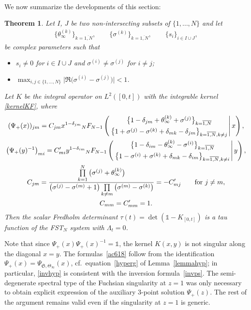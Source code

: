\documentclass[pdftex]{sigma}
\numberwithin{equation}{section}
\newtheorem{Theorem}{Theorem}[section]
\begin{document}
We now summarize the developments of this section:
\begin{Theorem}\label{theorem2F1} Let $I$, $J$ be two non-intersecting subsets of $\{1,\ldots,N\}$ and let
\begin{gather*}
\bigl\{\theta_{\infty}^{(k)}\bigr\}_{k=\overline{1,N}},\qquad \bigl\{\sigma^{(k)}\bigr\}_{k=\overline{1,N}},\qquad \{s_i \}_{i\in I\cup J},
\end{gather*}
be complex parameters such that
\begin{itemize}\itemsep=0pt
\item $s_i\ne 0$ for $i\in I\cup J$ and $\sigma^{(i)}\ne \sigma^{(j)}$ for $i\ne j$;
\item $\max_{i,j\in\{1,\ldots,N\}}\big|\Re \big(\sigma^{(i)}-\sigma^{(j)}\big)\big|<1$.
\end{itemize}
Let $K$ be the integral operator on $L^2([0,t])$ with the integrable kernel \eqref{kernelKF}, where
\begin{subequations}
\label{ac618}
\begin{gather}
(\Psi_+(x)) _{jm} = C_{jm} x^{1-\delta_{jm}}{}_{N}F_{N-1} \left(\left.\genfrac{}{}{0pt}{}{\bigl\{1-\delta_{jm}+\theta^{(k)}_{\infty}+\sigma^{(j)}\bigr\}_{k=\overline{1,N}}}{
\bigl\{1+\sigma^{(j)}-\sigma^{(k)}+\delta_{mk}-\delta_{jm}\bigr\}_{k=\overline{1,N},k\neq j}}\right|x\right) ,\\
\label{invhyp}
\bigl(\Psi_+( y)^{-1}\bigr)_{mi}= C'_{mi} y^{1-\delta_{im}} {}_{N}F_{N-1} \left(\left.\genfrac{}{}{0pt}{}{\bigl\{1-\delta_{im}-\theta^{(k)}_{\infty}-\sigma^{(i)}\bigr\}_{k=\overline{1,N}}}{
\bigl\{1-\sigma^{(i)}+\sigma^{(k)}+\delta_{mk}-\delta_{im}\bigr\}_{k=\overline{1,N},k\neq i}}\right|y\right) ,\\
C_{jm}=\frac{\prod\limits_{k=1}^N\big(\sigma^{(j)}+\theta^{(k)}_{\infty}\big)}{\big(\sigma^{(j)}-\sigma^{(m)}+1\big)\prod\limits_{k\neq m}\big(\sigma^{(m)}-\sigma^{(k)}\big)}=-C'_{mj}\qquad\text{for } j\neq m,\nonumber\\ C_{mm}=C'_{mm}=1.
\end{gather}
\end{subequations}
Then the scalar Fredholm determinant $\tau(t)=\det (\mathds 1 - K_{[0,t]})$ is a tau function of the FST$_N$ system with $\Lambda_t=0$.
\end{Theorem}

\begin{Remark} Note that since $\Psi_+(x)\Psi_+(x)^{-1}=\mathds 1$, the kernel $K(x,y)$ is not singular along the diagonal $x=y$. The formulas~\eqref{ac618} follow from the identification $\Psi_+(x)=\Psi_{\mathfrak{S} ,\Theta_\infty}(x)$, cf.\ equation~\eqref{hyperg} of Lemma~\ref{lemmahyp}; in particular, \eqref{invhyp} is consistent with the inversion formula~\eqref{invps}. The semi-degenerate spectral type of the Fuchsian singularity at $z=1$ was only necessary to obtain explicit expression of the auxiliary 3-point solution $\Psi_+(z)$. The rest of the argument remains valid even if the singularity at $z=1$ is generic.
\end{Remark}
\end{document}
